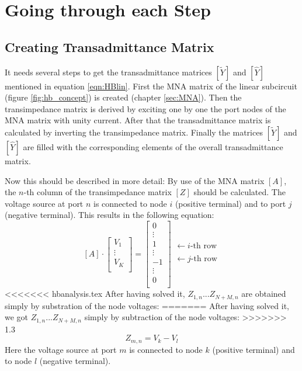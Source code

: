 \section{Going through each Step}

\subsection{Creating Transadmittance Matrix}

It needs several steps to get the transadmittance matrices $[\tilde{Y}]$
and $[\hat{Y}]$ mentioned in equation \eqref{eqn:HBlin}. First the MNA
matrix of the linear subcircuit (figure \ref{fig:hb_concept}) is created
(chapter \ref{sec:MNA}). Then the transimpedance matrix is derived by
exciting one by one the port nodes of the MNA matrix with unity current.
After that the transadmittance matrix is calculated by inverting the
transimpedance matrix. Finally the matrices $[\tilde{Y}]$ and $[\hat{Y}]$
are filled with the corresponding elements of the overall transadmittance
matrix.

\addvspace{12pt}

Now this should be described in more detail: By use of the MNA matrix
$[A]$, the $n$-th column of the transimpedance matrix $[Z]$ should be
calculated. The voltage source at port $n$ is connected to node $i$
(positive terminal) and to port $j$ (negative terminal). This results
in the following equation:
\begin{equation}
\label{eqn:HBtrans}
[A]\cdot
\begin{bmatrix}
V_1\\
\vdots\\
V_K\\
\end{bmatrix}
=
\begin{bmatrix}
0\\
\vdots\\
1\\
\vdots\\
-1\\
\vdots\\
0\\
\end{bmatrix}
\begin{matrix}
 \\
 \\
\leftarrow i\text{-th row}\\
 \\
\leftarrow j\text{-th row}\\
 \\
 \\
\end{matrix}
\end{equation}
<<<<<<< hbanalysis.tex
After having solved it, $Z_{1,n}$...$Z_{N+M,n}$ are obtained
simply by substration of the node voltages:
=======
After having solved it, we got $Z_{1,n}$...$Z_{N+M,n}$
simply by subtraction of the node voltages:
>>>>>>> 1.3
\begin{equation}
Z_{m,n} = V_k - V_l
\end{equation}
Here the voltage source at port $m$ is connected to node $k$
(positive terminal) and to node $l$ (negative terminal).

